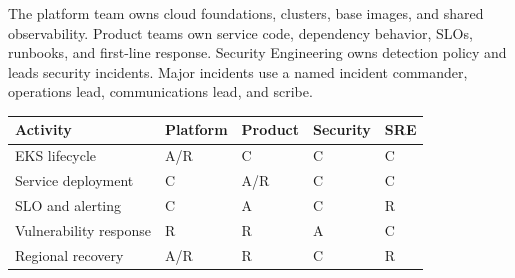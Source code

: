 The platform team owns cloud foundations, clusters, base images, and shared observability. Product teams own service code, dependency behavior, SLOs, runbooks, and first-line response. Security Engineering owns detection policy and leads security incidents. Major incidents use a named incident commander, operations lead, communications lead, and scribe.

\begin{tabularx}{\textwidth}{@{}Y C{22mm}C{22mm}C{22mm}C{22mm}@{}}
  \toprule
  \color{white}\textbf{Activity} & \color{white}\textbf{Platform} & \color{white}\textbf{Product} & \color{white}\textbf{Security} & \color{white}\textbf{SRE} \\
  \midrule
  EKS lifecycle & A/R & C & C & C \\
  Service deployment & C & A/R & C & C \\
  SLO and alerting & C & A & C & R \\
  Vulnerability response & R & R & A & C \\
  Regional recovery & A/R & R & C & R \\
  \bottomrule
\end{tabularx}

